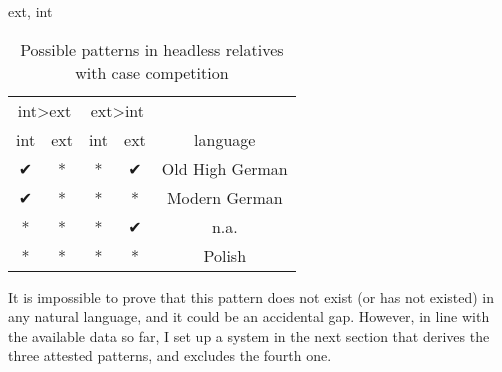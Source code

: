 \ac{ext}, \ac{int}

\begin{table}[H]
  \center
  \caption{Possible patterns in headless relatives with case competition}
    \begin{tabular}{cc|ccc}
    \toprule
    \multicolumn{2}{c}{\ac{int}>\ac{ext}}   & \multicolumn{2}{|c}{\ac{ext}>\ac{int}} &                                           \\
    \cmidrule(lr){1-2}                      \cmidrule(lr){3-4}
    \ac{int}            & \ac{ext}          & \ac{int}          & \ac{ext}            & language                                  \\
    \cmidrule(lr){1-1}  \cmidrule(lr){2-2}  \cmidrule(lr){3-3}  \cmidrule(lr){4-4}    \cmidrule(lr){5-5}
    ✔                   & *                 & *                 & ✔                   & Old High German                           \\
    ✔                   & *                 & *                 & *                   & Modern German                             \\
    {*}                 & *                 & *                 & ✔                   & n.a.                                      \\
    {*}                 & *                 & *                 & *                   & Polish                                    \\
    \bottomrule
  \end{tabular}
    \label{tbl:possible-headless-relatives-case-competition}
\end{table}

It is impossible to prove that this pattern does not exist (or has not existed) in any natural language, and it could be an accidental gap. However, in line with the available data so far, I set up a system in the next section that derives the three attested patterns, and excludes the fourth one.

